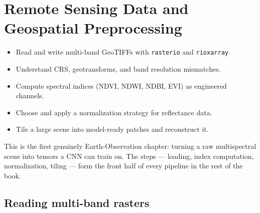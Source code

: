 \chapter{Remote Sensing Data and Geospatial Preprocessing}
\label{ch:preproc}


\begin{objbox}
\begin{itemize}[leftmargin=1.2em,nosep]
  \item Read and write multi-band GeoTIFFs with \texttt{rasterio} and \texttt{rioxarray}.
  \item Understand CRS, geotransforms, and band resolution mismatches.
  \item Compute spectral indices (NDVI, NDWI, NDBI, EVI) as engineered channels.
  \item Choose and apply a normalization strategy for reflectance data.
  \item Tile a large scene into model-ready patches and reconstruct it.
\end{itemize}
\end{objbox}

This is the first genuinely Earth-Observation chapter: turning a raw
multispectral scene into tensors a CNN can train on. The steps --- loading,
index computation, normalization, tiling --- form the front half of every
pipeline in the rest of the book.

\section{Reading multi-band rasters}

